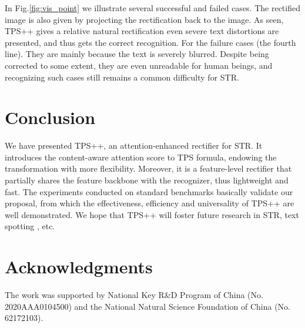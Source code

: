 \documentclass{article}
\begin{document}
In Fig.\ref{fig:vis_point} we illustrate several successful and failed cases. The rectified image is also given by projecting the rectification back to the image. As seen, TPS++ gives a relative natural rectification even severe text distortions are presented, and thus gets the correct recognition. For the failure cases (the fourth line). They are mainly because the text is severely blurred. Despite being corrected to some extent, they are even unreadable for human beings, and recognizing such cases still remains a common difficulty for STR.


\section{Conclusion}
We have presented TPS++, an attention-enhanced rectifier for STR. It introduces the content-aware attention score to TPS formula, endowing the transformation with more flexibility. Moreover, it is a feature-level rectifier that partially shares the feature backbone with the recognizer, thus lightweight and fast. The experiments conducted on standard benchmarks basically validate our proposal, from which the effectiveness, efficiency and universality of TPS++ are well demonstrated. We hope that TPS++ will foster future research in STR, text spotting \cite{fang2022abinet++}, etc.

\section*{Acknowledgments}
The work was supported by National Key R\&D Program of China (No. 2020AAA0104500) and the National Natural Science Foundation of China (No. 62172103).



\end{document}
